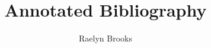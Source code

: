 \documentclass[12pt]{article}
\title{\textbf{Annotated Bibliography}}
\author{Raelyn Brooks}
\begin{document}
\maketitle

\nocite{*}



\end{document}
